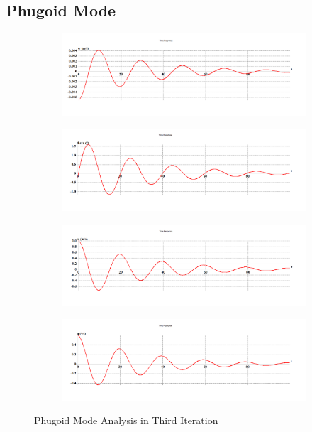\subsection{Phugoid Mode}
\begin{figure}[H]
\begin{subfigure}{0.48\textwidth}
\includegraphics[width = \linewidth]{w (1).png}
\end{subfigure}
\begin{subfigure}{0.48\textwidth}
\includegraphics[width = \linewidth]{theta (1).png}
\end{subfigure}
\medskip
\begin{subfigure}{0.48\textwidth}
\includegraphics[width = \linewidth]{u (1).png}
\end{subfigure}
\begin{subfigure}{0.48\textwidth}
\includegraphics[width = \linewidth]{q (1).png}
\end{subfigure}
\caption{Phugoid Mode Analysis in Third Iteration}
\end{figure}
